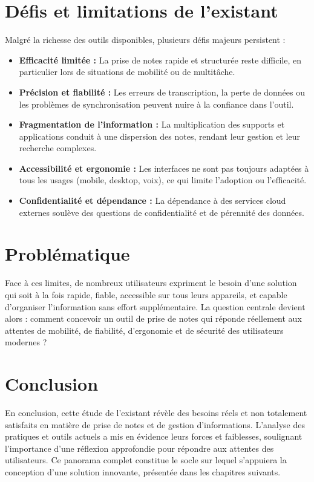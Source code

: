 \section{Défis et limitations de l’existant}

Malgré la richesse des outils disponibles, plusieurs défis majeurs persistent :
\begin{itemize}
    \item \textbf{Efficacité limitée :} La prise de notes rapide et structurée reste difficile, en particulier lors de situations de mobilité ou de multitâche.
    \item \textbf{Précision et fiabilité :} Les erreurs de transcription, la perte de données ou les problèmes de synchronisation peuvent nuire à la confiance dans l’outil.
    \item \textbf{Fragmentation de l’information :} La multiplication des supports et applications conduit à une dispersion des notes, rendant leur gestion et leur recherche complexes.
    \item \textbf{Accessibilité et ergonomie :} Les interfaces ne sont pas toujours adaptées à tous les usages (mobile, desktop, voix), ce qui limite l’adoption ou l’efficacité.
    \item \textbf{Confidentialité et dépendance :} La dépendance à des services cloud externes soulève des questions de confidentialité et de pérennité des données.
\end{itemize}

\section{Problématique}

Face à ces limites, de nombreux utilisateurs expriment le besoin d’une solution qui soit à la fois rapide, fiable, accessible sur tous leurs appareils, et capable d’organiser l’information sans effort supplémentaire. La question centrale devient alors : comment concevoir un outil de prise de notes qui réponde réellement aux attentes de mobilité, de fiabilité, d’ergonomie et de sécurité des utilisateurs modernes ?


\section*{Conclusion}
En conclusion, cette étude de l’existant révèle des besoins réels et non totalement satisfaits en matière de prise de notes et de gestion d’informations. L'analyse des pratiques et outils actuels a mis en évidence leurs forces et faiblesses, soulignant l'importance d'une réflexion approfondie pour répondre aux attentes des utilisateurs. Ce panorama complet constitue le socle sur lequel s’appuiera la conception d’une solution innovante, présentée dans les chapitres suivants.